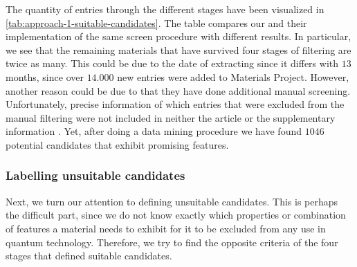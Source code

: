 \noindent The quantity of entries through the different stages have been visualized in \autoref{tab:approach-1-suitable-candidates}. The table compares our and their implementation of the same screen procedure with different results. In particular, we see that the remaining materials that have survived four stages of filtering are twice as many. This could be due to the date of extracting since it differs with $13$ months, since over $14.000$ new entries were added to Materials Project. However, another reason could be due to that they have done additional manual screening. Unfortunately, precise information of which entries that were excluded from the manual filtering were not included in neither the article or the supplementary information \cite{Ferrenti2020}. Yet, after doing a data mining procedure we have found $1046$ potential candidates that exhibit promising features.

\begin{table}[!ht]
\centering
\caption{A table that compares two different implementations of the same screen procedure. \citeauthor{Ferrenti2020} extracted information March of $2020$, while we did the extraction during April of $2021$. The adjusted difference is given as our reported entries divided on their reported entries.}
\label{tab:approach-1-suitable-candidates}
\noindent{}
\end{table}

\subsubsection{Labelling unsuitable candidates}

Next, we turn our attention to defining unsuitable candidates. This is perhaps the difficult part, since we do not know exactly which properties or combination of features a material needs to exhibit for it to be excluded from any use in quantum technology. Therefore, we try to find the opposite criteria of the four stages that defined suitable candidates.

